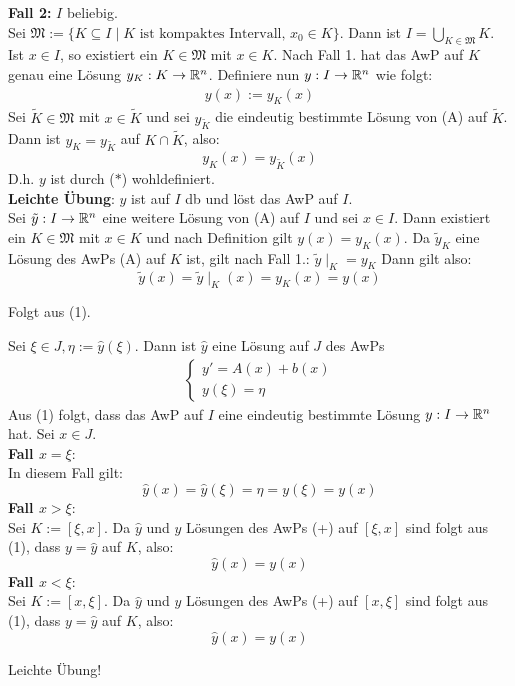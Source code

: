 \documentclass[a4paper,twoside,DIV15,BCOR12mm,chapterprefix=true,headings=twolinechapter]{scrbook}
\begin{document}
\begin{beweise}
\textbf{Fall 2:} $I$ beliebig.\\
Sei $\mathfrak{M}:=\{K\subseteq I\mid K\text{ ist kompaktes Intervall, } x_0\in K\}$.
Dann ist $I=\bigcup_{K\in\mathfrak{M}} K$.\\
Ist $x\in I$, so existiert ein $K\in\mathfrak{M}$ mit $x\in K$. Nach Fall 1. hat das
AwP auf $K$ genau eine Lösung $y_K:K\to\mathbb{R}^n$. Definiere nun $y:I\to\mathbb{R}^n$ wie folgt:
\begin{align}
y(x):=y_K(x)\tag{$*$}
\end{align}
Sei $\tilde K\in\mathfrak{M}$ mit $x\in\tilde K$ und sei $y_{\tilde K}$ die eindeutig
bestimmte Lösung von (A) auf $\tilde K$. Dann ist $y_K=y_{\tilde K}$ auf $K\cap\tilde K$, also:
\[y_K(x)=y_{\tilde K}(x)\]
D.h. $y$ ist durch ($*$) wohldefiniert.\\
\textbf{Leichte Übung}: $y$ ist auf $I$ db und löst das AwP auf $I$.\\
Sei $\tilde y:I\to\mathbb{R}^n$ eine weitere Lösung von (A) auf $I$ und sei $x\in I$.
Dann existiert ein $K\in\mathfrak{M}$ mit $x\in K$ und nach Definition gilt $y(x)=y_K(x)$.
Da $\tilde y_K$ eine Lösung des AwPs (A) auf $K$ ist, gilt nach Fall 1.: $\tilde y\mid_K=y_K$
Dann gilt also:
\[\tilde y(x)=\tilde y\mid_K(x)=y_K(x)=y(x)\]
\item Folgt aus (1).
\item Sei $\xi \in J,\eta:=\hat y(\xi)$. Dann ist $\hat y$ eine Lösung auf $J$ des AwPs
\begin{align*}
\tag{+}
\begin{cases}
y'=A(x)+b(x)\\
y(\xi)=\eta
\end{cases}
\end{align*}
Aus (1) folgt, dass das AwP auf $I$ eine eindeutig bestimmte Lösung $y:I\to\mathbb{R}^n$ hat. Sei $x\in J$.\\
\textbf{Fall $x=\xi$}:\\
In diesem Fall gilt: 
\[\hat y(x)=\hat y(\xi)=\eta=y(\xi)=y(x)\]
\textbf{Fall $x>\xi$}:\\
Sei $K:=[\xi,x]$. Da $\hat y$ und $y$ Lösungen des AwPs (+) auf $[\xi,x]$ sind folgt aus
(1), dass $y=\hat y$ auf $K$, also:
\[\hat y(x)=y(x)\]
\textbf{Fall $x<\xi$}:\\
Sei $K:=[x,\xi]$. Da $\hat y$ und $y$ Lösungen des AwPs (+) auf $[x,\xi]$ sind folgt aus
(1), dass $y=\hat y$ auf $K$, also:
\[\hat y(x)=y(x)\]
\item Leichte Übung!	
\end{beweise}
\end{document}
